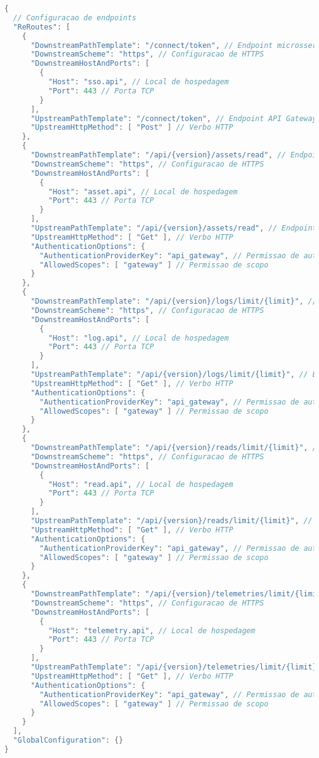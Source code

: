 \begin{lstlisting}[language=Java, label=gateway-endpoints]
{
  // Configuracao de endpoints
  "ReRoutes": [
    {
      "DownstreamPathTemplate": "/connect/token", // Endpoint microsservico de Identidade
      "DownstreamScheme": "https", // Configuracao de HTTPS
      "DownstreamHostAndPorts": [
        {
          "Host": "sso.api", // Local de hospedagem
          "Port": 443 // Porta TCP
        }
      ],
      "UpstreamPathTemplate": "/connect/token", // Endpoint API Gateway
      "UpstreamHttpMethod": [ "Post" ] // Verbo HTTP
    },
    {
      "DownstreamPathTemplate": "/api/{version}/assets/read", // Endpoint microsservico de Ativo
      "DownstreamScheme": "https", // Configuracao de HTTPS
      "DownstreamHostAndPorts": [
        {
          "Host": "asset.api", // Local de hospedagem
          "Port": 443 // Porta TCP
        }
      ],
      "UpstreamPathTemplate": "/api/{version}/assets/read", // Endpoint API Gateway
      "UpstreamHttpMethod": [ "Get" ], // Verbo HTTP
      "AuthenticationOptions": {
        "AuthenticationProviderKey": "api_gateway", // Permissao de autenticacao do cliente
        "AllowedScopes": [ "gateway" ] // Permissao de scopo
      }
    },
    {
      "DownstreamPathTemplate": "/api/{version}/logs/limit/{limit}", // Endpoint microsservico de Log
      "DownstreamScheme": "https", // Configuracao de HTTPS
      "DownstreamHostAndPorts": [
        {
          "Host": "log.api", // Local de hospedagem
          "Port": 443 // Porta TCP
        }
      ],
      "UpstreamPathTemplate": "/api/{version}/logs/limit/{limit}", // Endpoint API Gateway
      "UpstreamHttpMethod": [ "Get" ], // Verbo HTTP
      "AuthenticationOptions": {
        "AuthenticationProviderKey": "api_gateway", // Permissao de autenticacao do cliente
        "AllowedScopes": [ "gateway" ] // Permissao de scopo
      }
    },
    {
      "DownstreamPathTemplate": "/api/{version}/reads/limit/{limit}", // Endpoint microsservico de Leitura
      "DownstreamScheme": "https", // Configuracao de HTTPS
      "DownstreamHostAndPorts": [
        {
          "Host": "read.api", // Local de hospedagem
          "Port": 443 // Porta TCP
        }
      ],
      "UpstreamPathTemplate": "/api/{version}/reads/limit/{limit}", // Endpoint API Gateway
      "UpstreamHttpMethod": [ "Get" ], // Verbo HTTP
      "AuthenticationOptions": {
        "AuthenticationProviderKey": "api_gateway", // Permissao de autenticacao do cliente
        "AllowedScopes": [ "gateway" ] // Permissao de scopo
      }
    },
    {
      "DownstreamPathTemplate": "/api/{version}/telemetries/limit/{limit}", // Endpoint microsservico de Telemetria
      "DownstreamScheme": "https", // Configuracao de HTTPS
      "DownstreamHostAndPorts": [
        {
          "Host": "telemetry.api", // Local de hospedagem
          "Port": 443 // Porta TCP
        }
      ],
      "UpstreamPathTemplate": "/api/{version}/telemetries/limit/{limit}", // Endpoint API Gateway
      "UpstreamHttpMethod": [ "Get" ], // Verbo HTTP
      "AuthenticationOptions": {
        "AuthenticationProviderKey": "api_gateway", // Permissao de autenticacao do cliente
        "AllowedScopes": [ "gateway" ] // Permissao de scopo
      }
    }
  ],
  "GlobalConfiguration": {}
}
\end{lstlisting}

